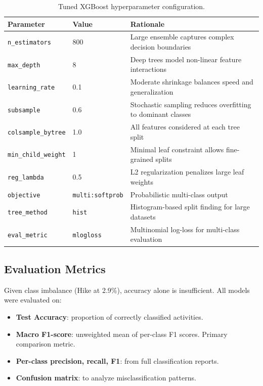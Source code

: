\documentclass[11pt, onecolumn]{article}
\begin{document}
\begin{table}[H]
\centering
\footnotesize
\caption{Tuned XGBoost hyperparameter configuration.}
\label{tab:xgb_params}
\begin{tabular}{llp{8cm}}
\toprule
\textbf{Parameter} & \textbf{Value} & \textbf{Rationale} \\
\midrule
\texttt{n\_estimators}      & 800   & Large ensemble captures complex decision boundaries \\
\texttt{max\_depth}         & 8     & Deep trees model non-linear feature interactions \\
\texttt{learning\_rate}     & 0.1   & Moderate shrinkage balances speed and generalization \\
\texttt{subsample}          & 0.6   & Stochastic sampling reduces overfitting to dominant classes \\
\texttt{colsample\_bytree}  & 1.0   & All features considered at each tree split \\
\texttt{min\_child\_weight} & 1     & Minimal leaf constraint allows fine-grained splits \\
\texttt{reg\_lambda}        & 0.5   & L2 regularization penalizes large leaf weights \\
\texttt{objective}          & \texttt{multi:softprob} & Probabilistic multi-class output \\
\texttt{tree\_method}       & \texttt{hist}           & Histogram-based split finding for large datasets \\
\texttt{eval\_metric}       & \texttt{mlogloss}       & Multinomial log-loss for multi-class evaluation \\
\bottomrule
\end{tabular}
\end{table}

\subsection{Evaluation Metrics}

Given class imbalance (Hike at 2.9\%), accuracy alone is insufficient. All models were evaluated on:
\begin{itemize}
    \item \textbf{Test Accuracy}: proportion of correctly classified activities.
    \item \textbf{Macro F1-score}: unweighted mean of per-class F1 scores. Primary comparison metric.
    \item \textbf{Per-class precision, recall, F1}: from full classification reports.
    \item \textbf{Confusion matrix}: to analyze misclassification patterns.
\end{itemize}
\end{document}
